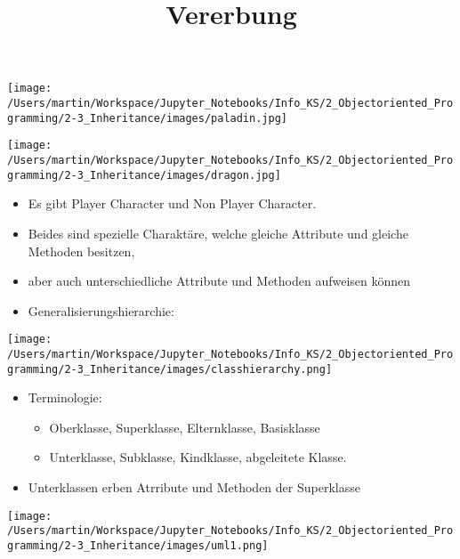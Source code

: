 \documentclass[
  11pt,
  a4paper,
  DIV=11,
  numbers=noendperiod]{scrartcl}
\title{Vererbung}
\author{}
\date{}
\providecommand{\tightlist}{%
  \setlength{\itemsep}{0pt}\setlength{\parskip}{0pt}}\usepackage{longtable,booktabs,array}
\begin{document}
\maketitle

\texttt{[image: /Users/martin/Workspace/Jupyter\_Notebooks/Info\_KS/2\_Objectoriented\_Programming/2-3\_Inheritance/images/paladin.jpg]}

\texttt{[image: /Users/martin/Workspace/Jupyter\_Notebooks/Info\_KS/2\_Objectoriented\_Programming/2-3\_Inheritance/images/dragon.jpg]}

\begin{itemize}
\item
  Es gibt Player Character und Non Player Character.
\item
  Beides sind spezielle Charaktäre, welche gleiche Attribute und gleiche
  Methoden besitzen,
\item
  aber auch unterschiedliche Attribute und Methoden aufweisen können
\item
  Generalisierungshierarchie:
\end{itemize}

\texttt{[image: /Users/martin/Workspace/Jupyter\_Notebooks/Info\_KS/2\_Objectoriented\_Programming/2-3\_Inheritance/images/classhierarchy.png]}

\begin{itemize}
\tightlist
\item
  Terminologie:

  \begin{itemize}
  \tightlist
  \item
    Oberklasse, Superklasse, Elternklasse, Basisklasse
  \item
    Unterklasse, Subklasse, Kindklasse, abgeleitete Klasse.
  \end{itemize}
\item
  Unterklassen erben Atrribute und Methoden der Superklasse
\end{itemize}

\texttt{[image: /Users/martin/Workspace/Jupyter\_Notebooks/Info\_KS/2\_Objectoriented\_Programming/2-3\_Inheritance/images/uml1.png]}
\end{document}
